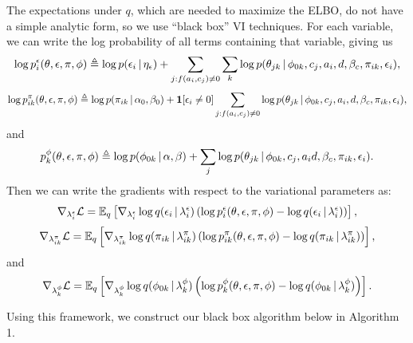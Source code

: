 The expectations under $q$, which are needed to maximize the ELBO, do not have a simple analytic form, so we use ``black box'' VI techniques.
For each variable, we can write the log probability of all terms containing that variable, giving us 
\[\log p^\epsilon_{i}(\theta, \epsilon, \pi, \phi) \triangleq \log p(\epsilon_{i} \, | \, \eta_\epsilon) + \sum_{j : f(a_i, c_j) \neq 0}\sum_k\log p(\theta_{jk} \, | \, \phi_{0k}, c_j, a_i, d, \beta_c, \pi_{ik}, \epsilon_i),\]
\[\log p^\pi_{ik}(\theta, \epsilon, \pi, \phi) \triangleq \log p(\pi_{ik} \, | \, \alpha_0, \beta_0) + \mathbf{1}[\epsilon_i \neq 0] \sum_{j : f(a_i, c_j) \neq 0}\log p(\theta_{jk} \, | \, \phi_{0k}, c_j, a_i, d, \beta_c, \pi_{ik}, \epsilon_i),\]
and
\[p^\phi_{k}(\theta, \epsilon, \pi, \phi) \triangleq \log p(\phi_{0k} \, | \, \alpha, \beta) + \sum_{j} \log p(\theta_{jk} \, | \, \phi_{0k}, c_j, a_i d, \beta_c, \pi_{ik}, \epsilon_i).\]
Then we can write the gradients with respect to the variational parameters as:
\[\nabla_{\lambda^\epsilon_{i}} \mathcal{L} = \mathbb{E}_q \left[ \nabla_{\lambda^\epsilon_{i}} \log q(\epsilon_{i} \, | \, \lambda^\epsilon_{i}) \left( \log p^\epsilon_{i}(\theta, \epsilon, \pi, \phi) - \log q(\epsilon_{i} \, | \, \lambda^\epsilon_{i}) \right)\right],\]
\[\nabla_{\lambda^\pi_{ik}} \mathcal{L} = \mathbb{E}_q \left[ \nabla_{\lambda^\pi_{ik}} \log q(\pi_{ik} \, | \, \lambda^\pi_{ik}) \left( \log p^\pi_{ik}(\theta, \epsilon, \pi, \phi) - \log q(\pi_{ik} \, | \, \lambda^\pi_{ik}) \right)\right],\]
and
\[\nabla_{\lambda^\phi_{k}} \mathcal{L} = \mathbb{E}_q \left[ \nabla_{\lambda^\phi_{k}} \log q(\phi_{0k} \, | \, \lambda^\phi_{k}) \left( \log p^\phi_{k}(\theta, \epsilon, \pi, \phi) - \log q(\phi_{0k} \, | \, \lambda^\phi_{k}) \right)\right].\]

Using this framework, we construct our black box algorithm below in Algorithm 1.

